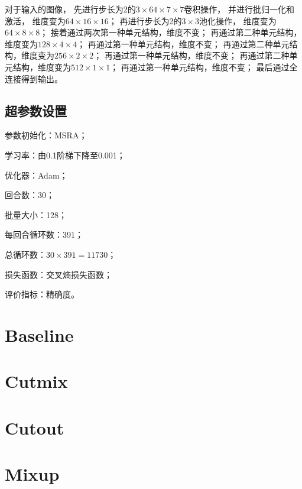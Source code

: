 \documentclass{article}
\begin{document}
对于输入的图像，
先进行步长为2的$3\times64\times7\times7$卷积操作，
并进行批归一化和激活，
维度变为$64\times16\times16$；
再进行步长为2的$3\times3$池化操作，
维度变为$64\times8\times8$；
接着通过两次第一种单元结构，维度不变；
再通过第二种单元结构，维度变为$128\times4\times4$；
再通过第一种单元结构，维度不变；
再通过第二种单元结构，维度变为$256\times2\times2$；
再通过第一种单元结构，维度不变；
再通过第二种单元结构，维度变为$512\times1\times1$；
再通过第一种单元结构，维度不变；
最后通过全连接得到输出。

\subsection{超参数设置}

参数初始化：MSRA；

学习率：由0.1阶梯下降至0.001；

优化器：Adam；

回合数：30；

批量大小：128；

每回合循环数：391；

总循环数：$ 30 \times 391 = 11730 $；

损失函数：交叉熵损失函数；

评价指标：精确度。

\section{Baseline}

\section{Cutmix}

\section{Cutout}

\section{Mixup}
\end{document}
